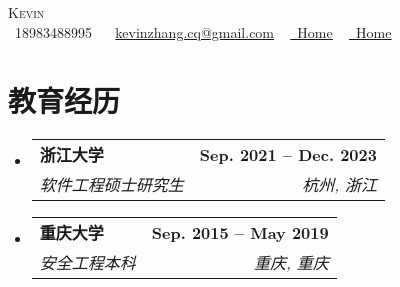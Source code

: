 \documentclass[letterpaper,11pt]{ctexart}
\makeatletter
\newcommand{\resumeSubheading}[4]{
  \vspace{-2pt}\item
    \begin{tabular*}{1.0\textwidth}[t]{l@{\extracolsep{\fill}}r}
      \textbf{#1} & \textbf{\small #2} \\
      \textit{\small#3} & \textit{\small #4} \\
    \end{tabular*}\vspace{-7pt}
}
\newcommand{\resumeSubHeadingListStart}{\begin{itemize}[leftmargin=0.0in, label={}]}
\newcommand{\resumeSubHeadingListEnd}{\end{itemize}}
\makeatother
\begin{document}

\begin{center}
    {\Huge \scshape Kevin} \\ \vspace{1pt}
    \vspace{1pt}
    \small \raisebox{-0.1\height}\faPhone\ 18983488995 ~ \raisebox{-0.2\height}\faEnvelope\  \underline{kevinzhang.cq@gmail.com} ~
    \href{https://linkedin.com/in/kevin-zhang-95245521b/}{\raisebox{-0.2\height}\faLinkedin\ \underline{Home}}  ~
    \href{https://github.com/kevin-zhangzh}{\raisebox{-0.2\height}\faGithub\ \underline{Home}}
    \vspace{-8pt}
\end{center}


\section{教育经历}
  \resumeSubHeadingListStart
    \resumeSubheading
      {浙江大学}{Sep. 2021 -- Dec. 2023}
      {软件工程硕士研究生}{杭州, 浙江}
    \resumeSubheading
      {重庆大学}{Sep. 2015 -- May 2019}
      {安全工程本科}{重庆, 重庆}
  \resumeSubHeadingListEnd

\end{document}
